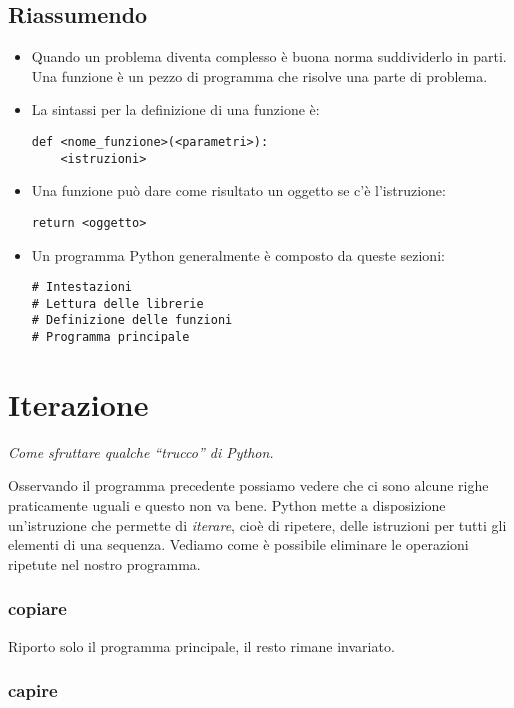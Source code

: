 \subsection{Riassumendo}
\begin{itemize} [noitemsep]
\item Quando un problema diventa complesso è buona norma suddividerlo in parti.
Una funzione è un pezzo di programma che risolve una parte di problema.
\item La sintassi per la definizione di una funzione è:
\begin{lstlisting}[numbers=none]
def <nome_funzione>(<parametri>):
    <istruzioni>
\end{lstlisting}
\item Una funzione può dare come risultato un oggetto se c'è l'istruzione:
\begin{lstlisting}[numbers=none]
    return <oggetto>
\end{lstlisting}
\item Un programma Python generalmente è composto da queste sezioni:
\begin{lstlisting}[numbers=none]
# Intestazioni
# Lettura delle librerie
# Definizione delle funzioni
# Programma principale
\end{lstlisting}
\end{itemize}

\section{Iterazione}
\label{subsec:geo_int_}

\emph{Come sfruttare qualche ``trucco'' di Python.}

Osservando il programma precedente possiamo vedere che ci sono alcune righe 
praticamente uguali e questo non va bene. Python mette a disposizione 
un'istruzione che permette di \emph{iterare}, cioè di ripetere, delle 
istruzioni per tutti gli elementi di una sequenza. Vediamo come è possibile 
eliminare le operazioni ripetute nel nostro programma. 

\subsubsection{copiare}

Riporto solo il programma principale, il resto rimane invariato.



\subsubsection{capire}

